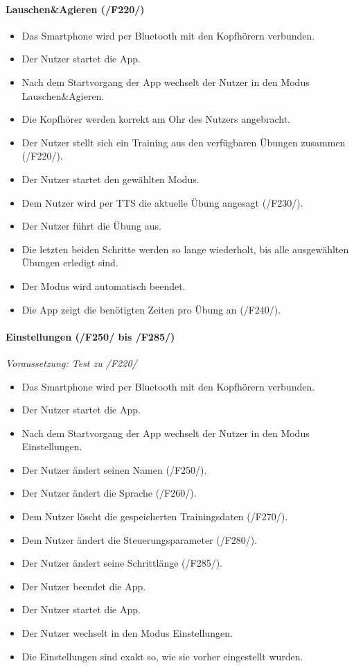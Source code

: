 \documentclass[a4paper,12pt]{article}
\begin{document}
  \paragraph{Lauschen\&Agieren (/F220/)}
  \begin{itemize}
    \item[] Das Smartphone wird per Bluetooth mit den Kopfhörern verbunden.
    \item[] Der Nutzer startet die App.
    \item[] Nach dem Startvorgang der App wechselt der Nutzer in den Modus \glqq Lauschen\&Agieren\grqq .
    \item[] Die Kopfhörer werden korrekt am Ohr des Nutzers angebracht.
    \item[] Der Nutzer stellt sich ein Training aus den verfügbaren Übungen zusammen (/F220/).
    \item[] Der Nutzer startet den gewählten Modus.
    \item[] Dem Nutzer wird per \Gls{TTS} die aktuelle Übung angesagt (/F230/).
    \item[] Der Nutzer führt die Übung aus.
    \item[] Die letzten beiden Schritte werden so lange wiederholt, bis alle ausgewählten Übungen erledigt sind.
    \item[] Der Modus wird automatisch beendet.
    \item[] Die App zeigt die benötigten Zeiten pro Übung an (/F240/).
  \end{itemize}

  \paragraph{Einstellungen (/F250/ bis /F285/)}
  \textit{Voraussetzung: Test zu /F220/}
  \begin{itemize}
    \item[] Das Smartphone wird per Bluetooth mit den Kopfhörern verbunden.
    \item[] Der Nutzer startet die App.
    \item[] Nach dem Startvorgang der App wechselt der Nutzer in den Modus \glqq Einstellungen\grqq .
    \item[] Der Nutzer ändert seinen Namen (/F250/).
    \item[] Der Nutzer ändert die Sprache (/F260/).
    \item[] Dem Nutzer löscht die gespeicherten Trainingsdaten (/F270/).
    \item[] Dem Nutzer ändert die Steuerungsparameter (/F280/).
    \item[] Der Nutzer ändert seine Schrittlänge (/F285/).
    \item[] Der Nutzer beendet die App.
    \item[] Der Nutzer startet die App.
    \item[] Der Nutzer wechselt in den Modus \glqq Einstellungen\grqq .
    \item[] Die Einstellungen sind exakt so, wie sie vorher eingestellt wurden.
  \end{itemize}
\end{document}
